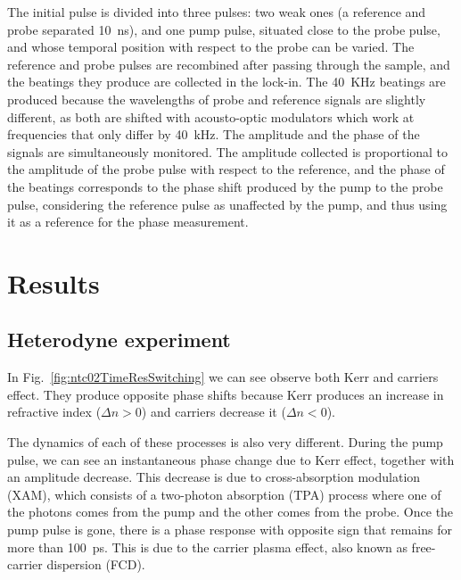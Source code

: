 \documentclass[twocolumn]{el-author}
\begin{document}
The initial pulse is divided into three pulses: two weak ones (a reference and probe separated 10~ns), and one pump pulse, situated close to the probe pulse, and whose temporal position with respect to the probe can be varied. The reference and probe pulses are recombined after passing through the sample, and the beatings they produce are collected in the lock-in. The 40~KHz beatings  are produced because the wavelengths of probe and reference signals are slightly different, as both are shifted with acousto-optic modulators which work at frequencies that only differ by 40~kHz. The amplitude and the phase of the signals are simultaneously monitored.
The amplitude collected is proportional to the amplitude of the probe pulse with respect to the reference, and the phase of the beatings corresponds to the phase shift produced by the pump to the probe pulse, considering the reference pulse as unaffected by the pump, and thus using it as a reference for the phase measurement. 



\section{Results}
\subsection{Heterodyne experiment}
In Fig.~\ref{fig:ntc02TimeResSwitching} we can see observe both Kerr and carriers effect. They produce opposite phase shifts because Kerr produces an increase in refractive index ($\Delta n > 0$) and carriers decrease it ($\Delta n < 0$).


The dynamics of each of these processes is also very different. During the pump pulse, we can see an instantaneous phase change due to Kerr effect, together with an amplitude decrease. This decrease is due to cross-absorption modulation (XAM), which consists of a two-photon absorption (TPA) process where one of the photons comes from the pump and the other comes from the probe. Once the pump pulse is gone, there is a phase response with opposite sign that remains for more than 100~ps. This is due to the carrier plasma effect, also known as free-carrier dispersion (FCD).
\end{document}
